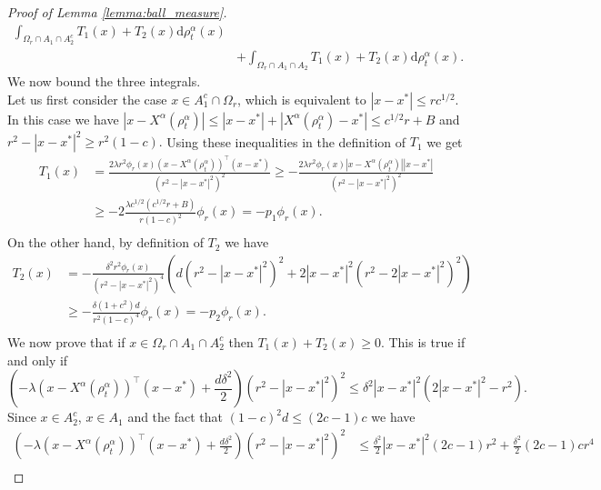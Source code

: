 \documentclass[10pt,a4paper]{amsart}
\newcommand{\Xalpha}{{X^\alpha}}
\newcommand{\diff}{\mathrm{d}}
\begin{document}
\begin{proof}[Proof of Lemma \ref{lemma:ball_measure}]
\begin{equation}
\begin{aligned}
    \int_{\Omega_r\cap A_1\cap A_2^c} T_1(x)+T_2(x)\diff\rho^\alpha_t(x) \\& +
    \int_{\Omega_r\cap A_1\cap A_2} T_1(x)+T_2(x)\diff\rho^\alpha_t(x).  
\end{aligned}\end{equation}
We now bound the three integrals.\\
Let us first consider the case $x\in A_1^c\cap\Omega_r$, which is equivalent to $ |x-x^*|\leq rc^{1/2}.$ In this case we have 
$|x-\Xalpha(\rho^\alpha_t)|\leq |x-x^*|+|\Xalpha(\rho^\alpha_t)-x^*|\leq c^{1/2}r+B$
and $r^2- |x-x^*|^2\geq r^2(1-c).$ Using these inequalities in the definition of $T_1$ we get
\begin{equation}
    \begin{aligned}
        T_1(x) &= \frac{2\lambda r^2\phi_r(x)(x-\Xalpha(\rho^\alpha_t))^\top(x-x^*)}{\left(r^2- |x-x^*|^2\right)^2}\geq-\frac{2\lambda r^2\phi_r(x)|x-\Xalpha(\rho^\alpha_t)| |x-x^*|}{\left(r^2- |x-x^*|^2\right)^2}\\
        &\geq-2\frac{\lambda c^{1/2}(c^{1/2}r+B)}{r(1-c)^2}\phi_r(x) = -p_1\phi_r(x).\\
    \end{aligned}
\end{equation}
On the other hand, by definition of $T_2$ we have
\begin{equation}
    \begin{aligned}
        T_2(x) &= -\frac{\delta^2r^2\phi_r(x)}{\left(r^2- |x-x^*|^2\right)^4}\left(d\left(r^2- |x-x^*|^2\right)^2+2 |x-x^*|^2{\left(r^2-2 |x-x^*|^2\right)^2}\right)\\
        &\geq -\frac{\delta(1+c^2)d}{r^2(1-c)^4}\phi_r(x) = -p_2\phi_r(x).\\
    \end{aligned}
\end{equation}
We now prove that if $x\in \Omega_r\cap A_1\cap A_2^c$ then $T_1(x)+T_2(x)\geq 0.$ This is true if and only if 
\begin{equation}\label{eq:A2_T1T2}
    \left(-\lambda(x-\Xalpha(\rho^\alpha_t))^\top(x-x^*)+\frac{d\delta^2}{2}\right)\left(r^2- |x-x^*|^2\right)^2 \leq \delta^2 |x-x^*|^2\left(2 |x-x^*|^2-r^2\right).
\end{equation}
Since $x\in A_2^c$, $x\in A_1$ and the fact that $(1-c)^2d\leq(2c-1)c$ we have 
\begin{equation*}\begin{aligned}
    \left(-\lambda(x-\Xalpha(\rho^\alpha_t))^\top(x-x^*)+\frac{d\delta^2}{2}\right)\left(r^2- |x-x^*|^2\right)^2 &\leq \frac{\delta^2}{2} |x-x^*|^2(2c-1)r^2 + \frac{\delta^2}{2}(2c-1)cr^4\\

\end{aligned}
\end{equation*}
\end{proof}
\end{document}
